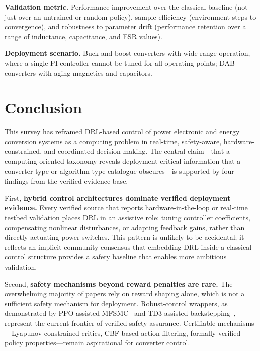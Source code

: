 \documentclass[manuscript,screen,review]{acmart}
\begin{document}
\textbf{Validation metric.}
Performance improvement over the classical baseline (not just over an untrained or random policy), sample efficiency (environment steps to convergence), and robustness to parameter drift (performance retention over a range of inductance, capacitance, and ESR values).

\textbf{Deployment scenario.}
Buck and boost converters with wide-range operation, where a single PI controller cannot be tuned for all operating points; DAB converters with aging magnetics and capacitors.

\section{Conclusion}
\label{sec:conclusion}

This survey has reframed DRL-based control of power electronic and energy conversion systems as a computing problem in real-time, safety-aware, hardware-constrained, and coordinated decision-making.
The central claim---that a computing-oriented taxonomy reveals deployment-critical information that a converter-type or algorithm-type catalogue obscures---is supported by four findings from the verified evidence base.

First, \textbf{hybrid control architectures dominate verified deployment evidence.}
Every verified source that reports hardware-in-the-loop or real-time testbed validation places DRL in an assistive role: tuning controller coefficients, compensating nonlinear disturbances, or adapting feedback gains, rather than directly actuating power switches.
This pattern is unlikely to be accidental; it reflects an implicit community consensus that embedding DRL inside a classical control structure provides a safety baseline that enables more ambitious validation.

Second, \textbf{safety mechanisms beyond reward penalties are rare.}
The overwhelming majority of papers rely on reward shaping alone, which is not a sufficient safety mechanism for deployment.
Robust-control wrappers, as demonstrated by PPO-assisted MFSMC~\cite{gheisarnejad2022reducing} and TD3-assisted backstepping~\cite{meng2022novel}, represent the current frontier of verified safety assurance.
Certifiable mechanisms---Lyapunov-constrained critics, CBF-based action filtering, formally verified policy properties---remain aspirational for converter control.
\end{document}

